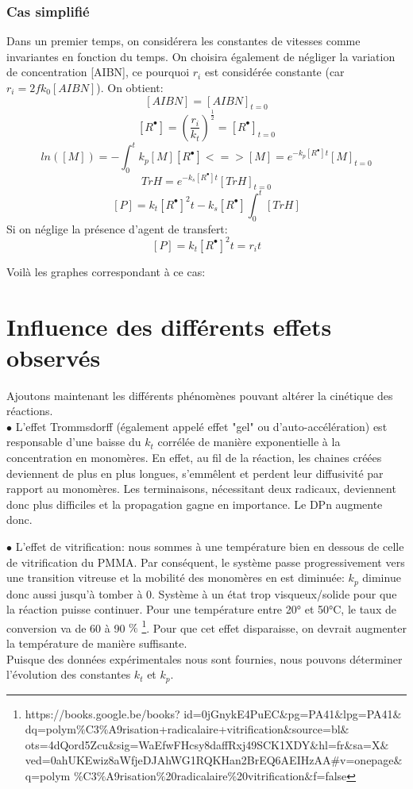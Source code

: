 \documentclass[a4paper,oneside,12pt]{article}
\begin{document}
\section{Cas simplifié}
Dans un premier temps, on considérera les constantes de vitesses comme invariantes en fonction du temps. On choisira également de négliger la variation de concentration [AIBN], ce pourquoi $r_i$ est considérée constante (car $r_i=2fk_0[AIBN]$). On obtient:
$$[AIBN]=[AIBN]_{t=0}$$
$$[R^{\bullet}]=(\frac{r_i}{k_t})^{\frac{1}{2}}=[R^{\bullet}]_{t=0}$$
$$ln([M])=-\int_0^{t} k_p[M][R^{\bullet}] <=> [M]=e^{-k_p[R^{\bullet}]t}[M]_{t=0}$$
$$TrH=e^{-k_s[R^{\bullet}]t}[TrH]_{t=0}$$
$$[P]=k_t[R^{\bullet}]^2 t - k_s[R^{\bullet}]\int_0^t [TrH]$$
Si on néglige la présence d'agent de transfert:
$$[P]=k_t[R^{\bullet}]^2t=r_i t$$

Voilà les graphes correspondant à ce cas:


\part{Influence des différents effets observés}

Ajoutons maintenant les différents phénomènes pouvant altérer la cinétique des réactions.\\

$\bullet$ L'effet Trommsdorff (également appelé effet "gel" ou d'auto-accélération) est responsable d'une baisse du $k_t$ corrélée de manière exponentielle à la concentration en monomères. En effet, au fil de la réaction, les chaines créées deviennent de plus en plus longues, s'emmêlent et perdent leur diffusivité par rapport au monomères. Les terminaisons, nécessitant deux radicaux, deviennent donc plus difficiles et la propagation gagne en importance. Le DPn augmente donc.\\
\space

$\bullet$ L'effet de vitrification: nous sommes à une température bien en dessous de celle de vitrification du PMMA. Par conséquent, le système passe progressivement vers une transition vitreuse et la mobilité des monomères en est diminuée: $k_p$ diminue donc aussi jusqu'à tomber à 0. Système à un état trop visqueux/solide pour que la réaction puisse continuer. Pour une température entre 20° et 50°C, le taux de conversion va de 60 à 90 $\%$ \footnote{https://books.google.be/books?
id=0jGnykE4PuEC$\&$pg=PA41$\&$lpg=PA41$\&$dq=polym$\%$C3$\%$A9risation+radicalaire+vitrification$\&$source=bl$\&$ots=4dQord5Zcu$\&$sig=WaEfwFHcsy8daffRxj49SCK1XDY$\&$hl=fr$\&$sa=X$\&$ved=0ahUKEwiz8aWfjeDJAhWG1RQKHan2BrEQ6AEIHzAA$\#$v=onepage$\&$q=polym
$\%$C3$\%$A9risation$\%$20radicalaire$\%$20vitrification$\&$f=false}.
Pour que cet effet disparaisse, on devrait augmenter la température de manière suffisante.\\
Puisque des données expérimentales nous sont fournies, nous pouvons déterminer l'évolution des constantes $k_t$ et $k_p$.\\
\end{document}
